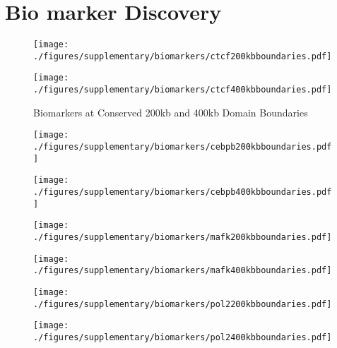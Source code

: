 \newpage
\section*{Bio marker Discovery}

\begin{figure}[H]
  \caption{Biomarkers at Conserved 200kb and 400kb Domain Boundaries}\label{fig:boundaryBiomarkers}
  \begin{minipage}{0.5\textwidth}%
    \texttt{[image: ./figures/supplementary/biomarkers/ctcf200kbboundaries.pdf]}
  \end{minipage}%
  \hfill
  \begin{minipage}{0.5\textwidth}
    \texttt{[image: ./figures/supplementary/biomarkers/ctcf400kbboundaries.pdf]}
  \end{minipage}
\end{figure}

\begin{figure}[H]
  \begin{minipage}{0.5\textwidth}%
    \texttt{[image: ./figures/supplementary/biomarkers/cebpb200kbboundaries.pdf]}
  \end{minipage}%
  \hfill
  \begin{minipage}{0.5\textwidth}
    \texttt{[image: ./figures/supplementary/biomarkers/cebpb400kbboundaries.pdf]}
  \end{minipage}
\end{figure}

\begin{figure}[H]
  \begin{minipage}{0.5\textwidth}%
    \texttt{[image: ./figures/supplementary/biomarkers/mafk200kbboundaries.pdf]}
  \end{minipage}%
  \hfill
  \begin{minipage}{0.5\textwidth}
    \texttt{[image: ./figures/supplementary/biomarkers/mafk400kbboundaries.pdf]}
  \end{minipage}
\end{figure}

\begin{figure}[H]
  \begin{minipage}{0.5\textwidth}%
    \texttt{[image: ./figures/supplementary/biomarkers/pol2200kbboundaries.pdf]}
  \end{minipage}%
  \hfill
  \begin{minipage}{0.5\textwidth}
    \texttt{[image: ./figures/supplementary/biomarkers/pol2400kbboundaries.pdf]}
  \end{minipage}
\end{figure}

